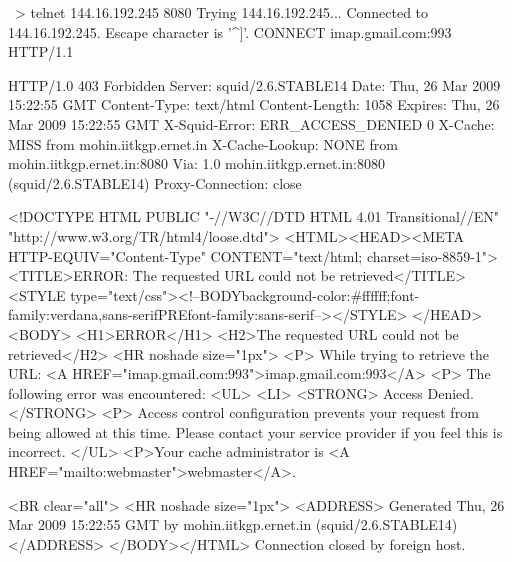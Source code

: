~> telnet 144.16.192.245 8080
Trying 144.16.192.245...
Connected to 144.16.192.245.
Escape character is '^]'.
CONNECT imap.gmail.com:993 HTTP/1.1

HTTP/1.0 403 Forbidden
Server: squid/2.6.STABLE14
Date: Thu, 26 Mar 2009 15:22:55 GMT
Content-Type: text/html
Content-Length: 1058
Expires: Thu, 26 Mar 2009 15:22:55 GMT
X-Squid-Error: ERR_ACCESS_DENIED 0
X-Cache: MISS from mohin.iitkgp.ernet.in
X-Cache-Lookup: NONE from mohin.iitkgp.ernet.in:8080
Via: 1.0 mohin.iitkgp.ernet.in:8080 (squid/2.6.STABLE14)
Proxy-Connection: close

<!DOCTYPE HTML PUBLIC "-//W3C//DTD HTML 4.01 Transitional//EN" "http://www.w3.org/TR/html4/loose.dtd">
<HTML><HEAD><META HTTP-EQUIV="Content-Type" CONTENT="text/html; charset=iso-8859-1">
<TITLE>ERROR: The requested URL could not be retrieved</TITLE>
<STYLE type="text/css"><!--BODY{background-color:#ffffff;font-family:verdana,sans-serif}PRE{font-family:sans-serif}--></STYLE>
</HEAD><BODY>
<H1>ERROR</H1>
<H2>The requested URL could not be retrieved</H2>
<HR noshade size="1px">
<P>
While trying to retrieve the URL:
<A HREF="imap.gmail.com:993">imap.gmail.com:993</A>
<P>
The following error was encountered:
<UL>
<LI>
<STRONG>
Access Denied.
</STRONG>
<P>
Access control configuration prevents your request from
being allowed at this time.  Please contact your service provider if
you feel this is incorrect.
</UL>
<P>Your cache administrator is <A HREF="mailto:webmaster">webmaster</A>. 


<BR clear="all">
<HR noshade size="1px">
<ADDRESS>
Generated Thu, 26 Mar 2009 15:22:55 GMT by mohin.iitkgp.ernet.in (squid/2.6.STABLE14)
</ADDRESS>
</BODY></HTML>
Connection closed by foreign host.

